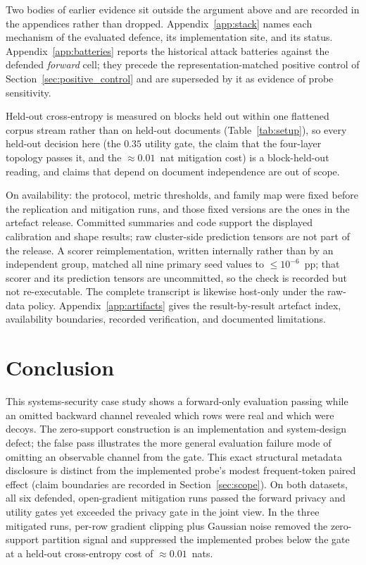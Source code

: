 \documentclass[11pt]{article}
\newcommand{\pp}{pp}
\begin{document}
Two bodies of earlier evidence sit outside the argument above and are recorded
in the appendices rather than dropped. Appendix~\ref{app:stack} names each
mechanism of the evaluated defence, its implementation site, and its status.
Appendix~\ref{app:batteries} reports the historical attack batteries against
the defended \emph{forward} cell; they precede the representation-matched
positive control of Section~\ref{sec:positive_control} and are superseded by it
as evidence of probe sensitivity.

Held-out cross-entropy is measured on blocks held out within one flattened
corpus stream rather than on held-out documents (Table~\ref{tab:setup}), so
every held-out decision here (the $0.35$ utility gate, the claim that the
four-layer topology passes it, and the $\approx 0.01$~nat mitigation cost) is a
block-held-out
reading, and claims that depend on document independence are out of scope.

On availability: the protocol, metric thresholds, and family map were fixed
before the replication and mitigation runs, and those fixed versions are the ones in the
artefact release. Committed summaries and code support the displayed
calibration and shape results; raw cluster-side prediction tensors are not part
of the release. A scorer reimplementation, written internally rather than by an
independent group, matched all nine primary seed values to $\le
10^{-6}$~\pp{}; that scorer and its prediction tensors are uncommitted, so the
check is recorded but not re-executable. The complete transcript is likewise
host-only under the raw-data policy. Appendix~\ref{app:artifacts} gives the
result-by-result artefact index, availability boundaries, recorded
verification, and documented limitations.

\section{Conclusion}

This systems-security case study shows a forward-only evaluation passing while
an omitted backward channel revealed which rows were real and which were decoys.
The zero-support construction is an implementation and system-design defect;
the false pass illustrates the more general evaluation failure mode of omitting
an observable channel from the gate. This exact structural metadata disclosure
is distinct from the implemented probe's modest frequent-token paired effect
(claim boundaries are recorded in Section~\ref{sec:scope}). On both datasets, all six defended,
open-gradient mitigation runs passed the forward
privacy and utility gates yet exceeded the privacy gate in the joint view. In
the three mitigated runs, per-row gradient clipping plus Gaussian noise removed
the zero-support partition signal and suppressed the implemented probes below
the gate at a held-out cross-entropy cost of $\approx 0.01$~nats.
\end{document}
